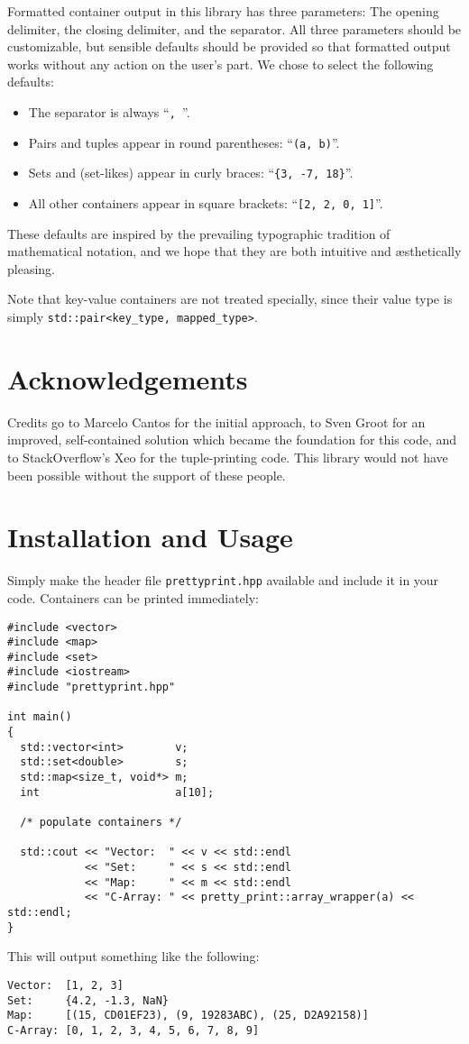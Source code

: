 \documentclass[a4paper,11pt]{article}
\begin{document}
Formatted container output in this library has three parameters: The
opening delimiter, the closing delimiter, and the separator. All three
parameters should be customizable, but sensible defaults should be
provided so that formatted output works without any action on the
user's part. We chose to select the following defaults:
\begin{itemize}
\item The separator is always ``\texttt{, }''.
\item Pairs and tuples appear in round parentheses: ``\texttt{(a, b)}''.
\item Sets and (set-likes) appear in curly braces: ``\texttt{\{3, -7, 18\}}''.
\item All other containers appear in square brackets: ``\texttt{[2, 2, 0, 1]}''.
\end{itemize}
These defaults are inspired by the prevailing typographic tradition
of mathematical notation, and we hope that they are both intuitive and
\ae{}sthetically pleasing.

Note that key-value containers are not treated specially, since their value
type is simply \texttt{std::pair<key\_type, mapped\_type>}.

\section*{Acknowledgements}

Credits go to Marcelo Cantos for the initial approach, to Sven Groot
for an improved, self-contained solution which became the foundation
for this code, and to StackOverflow's Xeo for the tuple-printing code.
This library would not have been possible without the support of these
people.

\section*{Installation and Usage}

Simply make the header file \texttt{prettyprint.hpp} available and include
it in your code. Containers can be printed immediately:

\begin{verbatim}#include <vector>
#include <map>
#include <set>
#include <iostream>
#include "prettyprint.hpp"

int main()
{
  std::vector<int>        v;
  std::set<double>        s;
  std::map<size_t, void*> m;
  int                     a[10];

  /* populate containers */

  std::cout << "Vector:  " << v << std::endl
            << "Set:     " << s << std::endl
            << "Map:     " << m << std::endl
            << "C-Array: " << pretty_print::array_wrapper(a) << std::endl;
}
\end{verbatim}
This will output something like the following:
\begin{verbatim}Vector:  [1, 2, 3]
Set:     {4.2, -1.3, NaN}
Map:     [(15, CD01EF23), (9, 19283ABC), (25, D2A92158)]
C-Array: [0, 1, 2, 3, 4, 5, 6, 7, 8, 9]
\end{verbatim}
\end{document}
